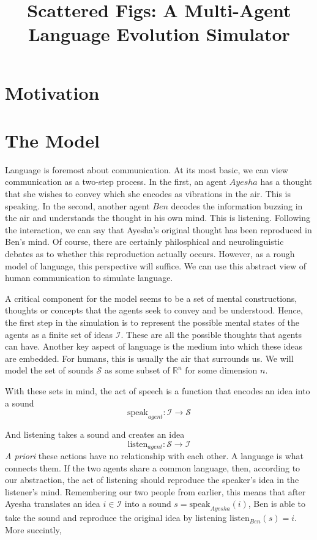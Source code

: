 \documentclass{article}
\title{Scattered Figs: A Multi-Agent Language Evolution Simulator}
\newcommand{\ideas}{\mathcal{I}}
\newcommand{\sounds}{\mathcal{S}}
\newcommand{\speak}{\text{speak}}
\newcommand{\listen}{\text{listen}}
\begin{document}
\maketitle

\section{Motivation}


\section{The Model}
Language is foremost about communication. At its most basic, we can view communication as a two-step process. In the first, an agent $Ayesha$ has a thought that she wishes to convey which she encodes as vibrations in the air. This is speaking. In the second, another agent $Ben$ decodes the information buzzing in the air and understands the thought in his own mind. This is listening. Following the interaction, we can say that Ayesha's original thought has been reproduced in Ben's mind. Of course, there are certainly philosphical and neurolinguistic debates as to whether this reproduction actually occurs. However, as a rough model of language, this perspective will suffice. We can use this abstract view of human communication to simulate language. 

A critical component for the model seems to be a set of mental constructions, thoughts or concepts that the agents seek to convey and be understood. Hence, the first step in the simulation is to represent the possible mental states of the agents as a finite set of ideas $\ideas$. These are all the possible thoughts that agents can have. Another key aspect of language is the medium into which these ideas are embedded. For humans, this is usually the air that surrounds us. We will model the set of sounds $\sounds$ as some subset of $\mathbb{R}^n$ for some dimension $n$. 

With these sets in mind, the act of speech is a function that encodes an idea into a sound
$$\text{speak}_{agent}:\ideas\to\sounds $$

And listening takes a sound and creates an idea
$$\text{listen}_{agent}:\sounds\to\ideas$$
\textit{A priori} these actions have no relationship with each other. A language is what connects them. If the two agents share a common language, then, according to our abstraction, the act of listening should reproduce the speaker's idea in the listener's mind. Remembering our two people from earlier, this means that after Ayesha translates an idea $i\in\ideas$ into a sound $s = \speak_{Ayesha}(i)$, Ben is able to take the sound and reproduce the original idea by listening $\listen_{Ben}(s) = i$. More succintly, 
\end{document}
